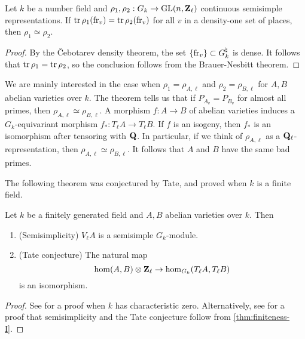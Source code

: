 \begin{theorem}\label{thm:trace-determines-rep}
Let $k$ be a number field and $\rho_1,\rho_2:G_k \to \operatorname{GL}(n,\mathbf{Z}_\ell)$ 
continuous semisimple representations. If 
$\operatorname{tr} \rho_1(\mathrm{fr}_v) = \operatorname{tr} \rho_2(\mathrm{fr}_v)$ for all $v$ in a density-one 
set of places, then $\rho_1\simeq \rho_2$. 
\end{theorem}
\begin{proof}
By the \v Cebotarev density theorem, the set $\{\mathrm{fr}_v\}\subset G_k^\natural$ 
is dense. It follows that $\operatorname{tr} \rho_1 = \operatorname{tr} \rho_2$, so the conclusion 
follows from the Brauer-Nesbitt theorem. 
\end{proof}

We are mainly interested in the case when $\rho_1=\rho_{A,\ell}$ and 
$\rho_2=\rho_{B,\ell}$ for $A,B$ abelian varieties over $k$. The theorem tells 
us that if $P_{A_v} = P_{B_v}$ for almost all primes, then 
$\rho_{A,\ell}\simeq \rho_{B,\ell}$. A morphism $f:A\to B$ of abelian varieties 
induces a $G_k$-equivariant morphism $f_\ast:T_\ell A \to T_\ell B$. If $f$ is 
an isogeny, then $f_\ast$ is an isomorphism after tensoring with $\mathbf{Q}$. In 
particular, if we think of $\rho_{A,\ell}$ as a $\mathbf{Q}_\ell$-representation, then 
$\rho_{A,\ell}\simeq \rho_{B,\ell}$. It follows that $A$ and $B$ have the same 
bad primes. 

The following theorem was conjectured by Tate, and proved when $k$ is a finite 
field. 

\begin{theorem}[Faltings]
Let $k$ be a finitely generated field and $A,B$ abelian varieties over $k$. 
Then 
\begin{enumerate} %
  \item (Semisimplicity) $V_\ell A$ is a semisimple $G_k$-module. 
  \item (Tate conjecture) The natural map
    \[
      \hom(A,B)\otimes\mathbf{Z}_\ell \to \hom_{G_k}(T_\ell A,T_\ell B)
    \]
    is an isomorphism. 
\end{enumerate}
\end{theorem}
\begin{proof}
See \cite{fa84} for a proof when $k$ has characteristic zero. Alternatively, 
see \cite[IV.2.5]{mi-av} for a proof that semisimplicity and the Tate 
conjecture follow from \autoref{thm:finiteness-I}. 
\end{proof}

